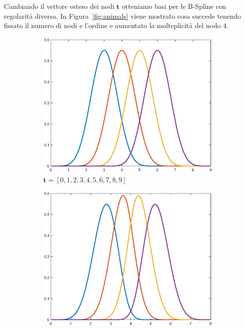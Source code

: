 \documentclass[a4paper, 10pt]{article}
\begin{document}
Cambiando il vettore esteso dei nodi $\mathbf{t}$ otteniamo basi per le B-Spline con regolarità diversa.
In Figura~\ref{fig:animals} viene mostrato cosa succede tenendo fissato il numero di nodi e l'ordine e aumentato la molteplicità del nodo $4$.

\begin{figure}[]
  \centering
  \begin{subfigure}[b]{0.3\textwidth}
    \includegraphics[width=\textwidth]{figure/6_41.eps}
    \caption{$\mathbf{t} = [0, 1, 2, 3, 4, 5, 6, 7, 8, 9]$}
    \label{fig:641}
  \end{subfigure}
  \begin{subfigure}[b]{0.3\textwidth}
      \includegraphics[width=\textwidth]{figure/6_42.eps}

\end{subfigure}
\end{figure}
\end{document}
